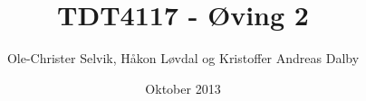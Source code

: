 \documentclass[]{article}
\begin{document}
\title{TDT4117 - Øving 2}
\author{Ole-Christer Selvik, Håkon Løvdal og Kristoffer Andreas Dalby}
\date{Oktober 2013}
\maketitle

\pagebreak




\end{document}
